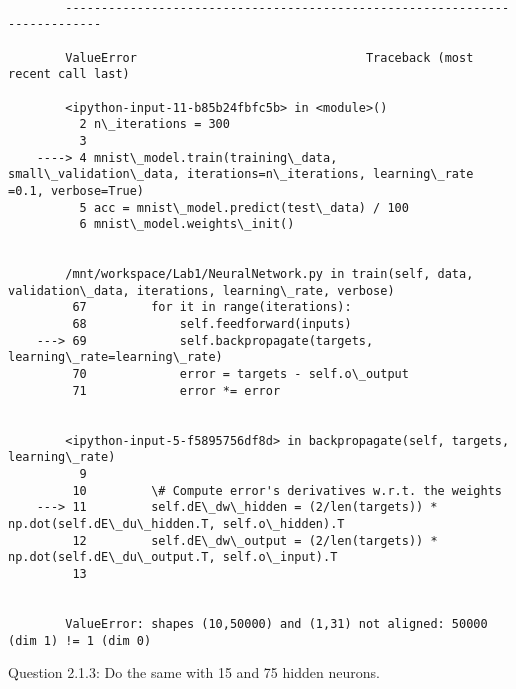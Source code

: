 \documentclass[11pt]{article}
\begin{document}
    \begin{Verbatim}[commandchars=\\\{\}]

        ---------------------------------------------------------------------------

        ValueError                                Traceback (most recent call last)

        <ipython-input-11-b85b24fbfc5b> in <module>()
          2 n\_iterations = 300
          3 
    ----> 4 mnist\_model.train(training\_data, small\_validation\_data, iterations=n\_iterations, learning\_rate =0.1, verbose=True)
          5 acc = mnist\_model.predict(test\_data) / 100
          6 mnist\_model.weights\_init()


        /mnt/workspace/Lab1/NeuralNetwork.py in train(self, data, validation\_data, iterations, learning\_rate, verbose)
         67         for it in range(iterations):
         68             self.feedforward(inputs)
    ---> 69             self.backpropagate(targets, learning\_rate=learning\_rate)
         70             error = targets - self.o\_output
         71             error *= error


        <ipython-input-5-f5895756df8d> in backpropagate(self, targets, learning\_rate)
          9 
         10         \# Compute error's derivatives w.r.t. the weights
    ---> 11         self.dE\_dw\_hidden = (2/len(targets)) * np.dot(self.dE\_du\_hidden.T, self.o\_hidden).T
         12         self.dE\_dw\_output = (2/len(targets)) * np.dot(self.dE\_du\_output.T, self.o\_input).T
         13 


        ValueError: shapes (10,50000) and (1,31) not aligned: 50000 (dim 1) != 1 (dim 0)

    \end{Verbatim}

    Question 2.1.3: Do the same with 15 and 75 hidden neurons.
\end{document}
